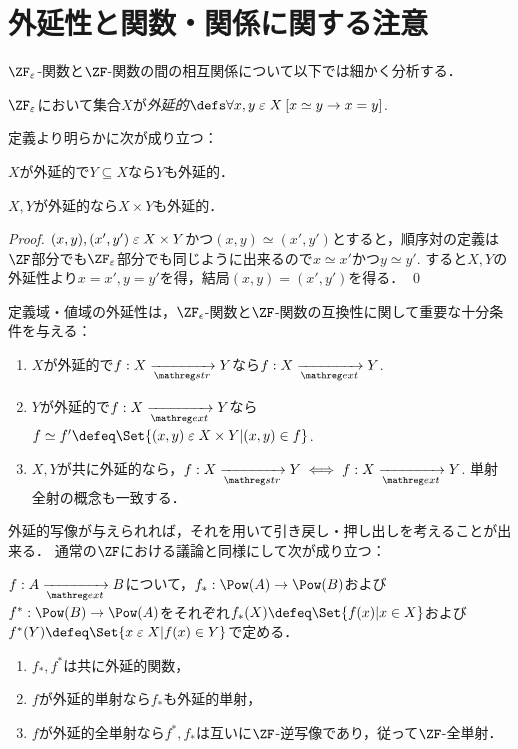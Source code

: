 \documentclass[realisability.tex]{subfiles}
\begin{document}
\section{外延性と関数・関係に関する注意}
$\ZFe$-関数と$\ZF$-関数の間の相互関係について以下では細かく分析する．

\begin{definition}
 $\ZFe$において集合$X$が\emph{外延的}$\defs \forall x, y \strin X \: [x \simeq y \to x = y]$.
\end{definition}

定義より明らかに次が成り立つ：

\begin{lemma}
 $X$が外延的で$Y \subseteq X$なら$Y$も外延的．
\end{lemma}
\begin{lemma}
 $X, Y$が外延的なら$X \times Y$も外延的．
\end{lemma}
\begin{proof}
 $(x, y), (x', y') \mathrel{\varepsilon} X \times Y$かつ$(x, y) \simeq (x', y')$とすると，順序対の定義は$\ZF$部分でも$\ZFe$部分でも同じように出来るので$x \simeq x'$かつ$y \simeq y'$.
 すると$X, Y$の外延性より$x = x', y = y'$を得，結局$(x, y) = (x', y')$を得る． \qed
\end{proof}

定義域・値域の外延性は，$\ZF_\epsilon$-関数と$\ZF$-関数の互換性に関して重要な十分条件を与える：
\begin{lemma}
 \begin{enumerate}
  \item $X$が外延的で$f: X \strto Y$なら$f: X \extto Y$.
  \item $Y$が外延的で$f: X \extto Y$なら$f \simeq f' \defeq \Set{(x, y) \strin X \times Y | (x, y) \in f}$.
  \item $X, Y$が共に外延的なら，$f: X \strto Y \iff f: X \extto Y$. 単射全射の概念も一致する．
 \end{enumerate}
\end{lemma}

外延的写像が与えられれば，それを用いて引き戻し・押し出しを考えることが出来る．
通常の$\ZF$における議論と同様にして次が成り立つ：
\begin{lemma}
 $f: A \extto B$について，$f_*: \Pow(A) \to \Pow(B)$および$f^*: \Pow(B) \to \Pow(A)$をそれぞれ$f_*(X) \defeq \Set{ f(x) | x \in X }$および$f^*(Y) \defeq \Set{x \strin X | f(x) \in Y}$で定める．
 \begin{enumerate}
  \item $f_*, f^*$は共に外延的関数，
  \item $f$が外延的単射なら$f_*$も外延的単射，
  \item $f$が外延的全単射なら$f^*, f_*$は互いに$\ZF$-逆写像であり，従って$\ZF$-全単射．
 \end{enumerate}
\end{lemma}
\end{document}
